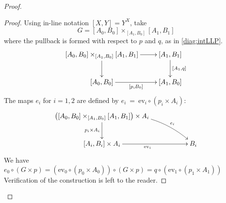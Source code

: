 \documentclass[12pt]{article}
\makeatletter
\newcommand{\pbcorner}[1][dr]{\save*!/#1-1.2pc/#1:(-1,1)@^{|-}\restore}
\newcommand{\ev}{\ensuremath{\mathrm{ev}}}
\theoremstyle{definition}
\makeatother
\begin{document}
\begin{proof}
\begin{proof}
Using in-line notation $[X,Y] = Y^X$, take $$G = [{A_0}, B_0]\times_{[{A_1},B_0]} [{A_1}, B_1]$$ where the pullback  is formed with respect to $p$ and $q$, as in \eqref{diag:intLLP}.
\begin{equation}\label{diag:required}
\xymatrix{
[{A_0}, B_0]\times_{[{A_1},B_0]} [{A_1}, B_1] \ar[d] \ar[r] & [{A_1}, B_1] \ar[d]^{[{A_1}, q]} \\
[{A_0}, B_0] \ar[r]_{[p, B_0]}  	& 	[{A_1},B_0]
}
\end{equation}
The maps $e_i$ for $i=1,2$ are defined by $e_i\ =\ \ev_i \circ (p_i\times A_i)$:
\[
\xymatrix{
\big( [{A_0}, B_0]\times_{[{A_1},B_0]} [{A_1}, B_1]\big) \times A_i \ar[d]_{p_i\times A_i} \ar@/^4ex /[rrd]^-{e_i}&&  \\
 [{A_i}, B_i] \times A_i 	\ar[rr]_{\ev_i} && 	B_i
}
\]
We have $e_0 \circ (G\times p) = (\ev_0 \circ (p_0\times A_0)) \circ (G\times p) 
= q\circ (\ev_1 \circ (p_1\times A_1))$
Verification of the construction is left to the reader.
\end{proof}

%
%


\end{proof}
\end{document}
